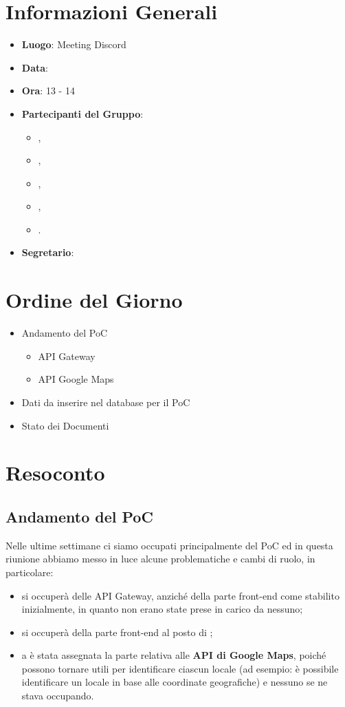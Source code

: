 \section{Informazioni Generali}

\begin{itemize}
\item{\textbf{Luogo}}: Meeting Discord
\item{\textbf{Data}}: \D
\item{\textbf{Ora}}: 13 - 14
\item{\textbf{Partecipanti del Gruppo}}: 
	\begin{itemize}
	\item{\EP{},} 
	\item{\FP{},}
	\item{\GC{},}
	\item{\LW{},}
	\item{\MG{}.}
	\end{itemize} 
\item{\textbf{Segretario}}: \GC{}	
\end{itemize}

\section{Ordine del Giorno}
\begin{itemize}
\item{Andamento del PoC}
\begin{itemize}
\item{API Gateway}
\item{API Google Maps}
\end{itemize}
\item{Dati da inserire nel database per il PoC}
\item{Stato dei Documenti}
\end{itemize}

\section{Resoconto}
 
\subsection{Andamento del PoC}

Nelle ultime settimane ci siamo occupati principalmente del PoC ed in questa riunione abbiamo messo in luce alcune problematiche e cambi di ruolo, in particolare: 
\begin{itemize}
\item \EP{} si occuperà delle API Gateway, anziché della parte front-end come stabilito inizialmente, in quanto non erano state prese in carico da nessuno;
\item \LW{} si occuperà della parte front-end al posto di \EP{};
\item a \PV{} è stata assegnata la parte relativa alle \textbf{API di Google Maps}, poiché possono tornare utili per identificare ciascun locale (ad esempio: è possibile identificare un locale in base alle coordinate geografiche) e nessuno se ne stava occupando.
\end{itemize}

